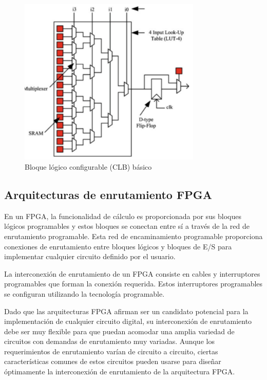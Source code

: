 \documentclass[12pt]{article}
\begin{document}
\begin{figure}[H]
  \centering
  \includegraphics[height=8cm]{3-Basic-logic-element.png}
  \caption{Bloque lógico configurable (CLB) básico}
  \label{fig:3}
\end{figure}

\subsection{Arquitecturas de enrutamiento FPGA}

En un FPGA, la funcionalidad de cálculo es proporcionada por sus bloques lógicos programables y estos bloques se conectan entre sí a través de la red de enrutamiento programable. Esta red de encaminamiento programable proporciona conexiones de enrutamiento entre bloques lógicos y bloques de E/S para implementar cualquier circuito definido por el usuario.

La interconexión de enrutamiento de un FPGA consiste en cables y interruptores programables que forman la conexión requerida. Estos interruptores programables se configuran utilizando la tecnología programable.


Dado que las arquitecturas FPGA afirman ser un candidato potencial para la implementación de cualquier circuito digital, su interconexión de enrutamiento debe ser muy flexible para que puedan acomodar una amplia variedad de circuitos con demandas de enrutamiento muy variadas. Aunque los requerimientos de enrutamiento varían de circuito a circuito, ciertas características comunes de estos circuitos pueden usarse para diseñar óptimamente la interconexión de enrutamiento de la arquitectura FPGA.
\end{document}
